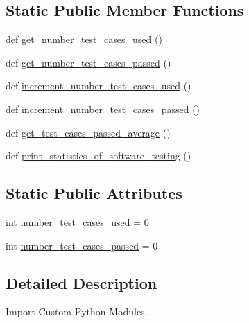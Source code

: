 \subsection*{Static Public Member Functions}
\begin{DoxyCompactItemize}
\item 
def \hyperlink{classstatistics_1_1test__statistics_1_1statistical__analysis_a8bddd92400d64e68caf934defa5ededb}{get\+\_\+number\+\_\+test\+\_\+cases\+\_\+used} ()
\item 
def \hyperlink{classstatistics_1_1test__statistics_1_1statistical__analysis_a0461b276e37fd6c24ab919efbeb04309}{get\+\_\+number\+\_\+test\+\_\+cases\+\_\+passed} ()
\item 
def \hyperlink{classstatistics_1_1test__statistics_1_1statistical__analysis_a7e88e87c8e6739dcaa37740985089f11}{increment\+\_\+number\+\_\+test\+\_\+cases\+\_\+used} ()
\item 
def \hyperlink{classstatistics_1_1test__statistics_1_1statistical__analysis_a056f55c0e7f60e29d4b37e8e74d3cd08}{increment\+\_\+number\+\_\+test\+\_\+cases\+\_\+passed} ()
\item 
def \hyperlink{classstatistics_1_1test__statistics_1_1statistical__analysis_a1bec04d2404b2bdf277c4ba170abb4a1}{get\+\_\+test\+\_\+cases\+\_\+passed\+\_\+average} ()
\item 
def \hyperlink{classstatistics_1_1test__statistics_1_1statistical__analysis_ad6bdf2cde8553974d93d5971870970d8}{print\+\_\+statistics\+\_\+of\+\_\+software\+\_\+testing} ()
\end{DoxyCompactItemize}
\subsection*{Static Public Attributes}
\begin{DoxyCompactItemize}
\item 
int \hyperlink{classstatistics_1_1test__statistics_1_1statistical__analysis_afed7a27a010e7377d2719b315d5d5f17}{number\+\_\+test\+\_\+cases\+\_\+used} = 0
\item 
int \hyperlink{classstatistics_1_1test__statistics_1_1statistical__analysis_ac7555db570919cec38a8325d8427093e}{number\+\_\+test\+\_\+cases\+\_\+passed} = 0
\end{DoxyCompactItemize}


\subsection{Detailed Description}
Import Custom Python Modules. 

